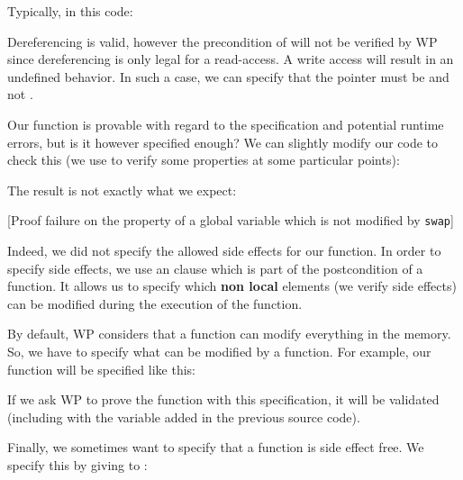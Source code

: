 Typically, in this code:






Dereferencing  is valid, however the precondition of
 will not be verified by WP since dereferencing
 is only legal for a read-access. A write access will
result in an undefined behavior. In such a case, we can specify that the
pointer  must be  and not
.





Our  function is provable with regard to the specification
and potential runtime errors, but is it however specified enough? We can
slightly modify our code to check this (we use  to verify
some properties at some particular points):






The result is not exactly what we expect:



[Proof failure on the property of a global variable which is not
  modified by \texttt{swap}]


Indeed, we did not specify the allowed side effects for our function. In
order to specify side effects, we use an  clause which is
part of the postcondition of a function. It allows us to specify which
\textbf{non local} elements (we verify side effects) can be modified
during the execution of the function.



By default, WP considers that a function can modify everything in the
memory. So, we have to specify what can be modified by a function. For
example, our  function will be specified like this:






If we ask WP to prove the function with this specification, it will be
validated (including with the variable added in the previous source
code).



Finally, we sometimes want to specify that a function is side effect
free. We specify this by giving  to
:



